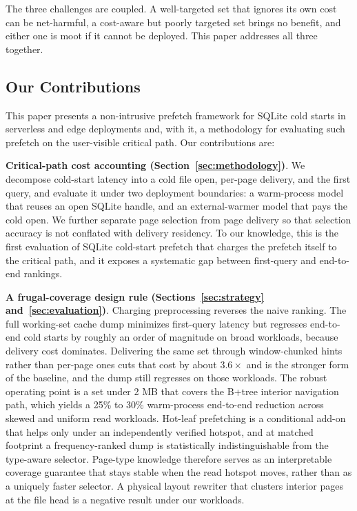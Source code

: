 \documentclass[sigconf, nonacm]{acmart}
\begin{document}
The three challenges are coupled. A well-targeted set that ignores its own cost can be net-harmful, a cost-aware but poorly targeted set brings no benefit, and either one is moot if it cannot be deployed. This paper addresses all three together.

\subsection{Our Contributions}\label{sec:contribution}

This paper presents a non-intrusive prefetch framework for SQLite cold starts in serverless and edge deployments and, with it, a methodology for evaluating such prefetch on the user-visible critical path. Our contributions are:

\textbf{Critical-path cost accounting (Section~\ref{sec:methodology})}. We decompose cold-start latency into a cold file open, per-page delivery, and the first query, and evaluate it under two deployment boundaries: a warm-process model that reuses an open SQLite handle, and an external-warmer model that pays the cold open. We further separate page selection from page delivery so that selection accuracy is not conflated with delivery residency. To our knowledge, this is the first evaluation of SQLite cold-start prefetch that charges the prefetch itself to the critical path, and it exposes a systematic gap between first-query and end-to-end rankings.

\textbf{A frugal-coverage design rule (Sections~\ref{sec:strategy} and~\ref{sec:evaluation})}.  Charging preprocessing reverses the naive ranking. The full working-set cache dump minimizes first-query latency but regresses end-to-end cold starts by roughly an order of magnitude on broad workloads, because delivery cost dominates. Delivering the same set through window-chunked hints rather than per-page ones cuts that cost by about $3.6\times$ and is the stronger form of the baseline, and the dump still regresses on those workloads. The robust operating point is a set under 2 MB that covers the B+tree interior navigation path, which yields a 25\% to 30\% warm-process end-to-end reduction across skewed and uniform read workloads. Hot-leaf prefetching is a conditional add-on that helps only under an independently verified hotspot, and at matched footprint a frequency-ranked dump is statistically indistinguishable from the type-aware selector. Page-type knowledge therefore serves as an interpretable coverage guarantee that stays stable when the read hotspot moves, rather than as a uniquely faster selector. A physical layout rewriter that clusters interior pages at the file head is a negative result under our workloads.
\end{document}
